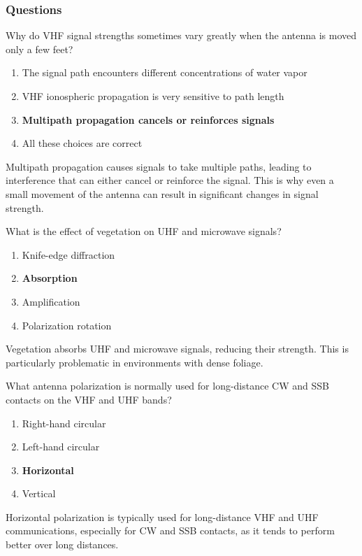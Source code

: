 \subsubsection*{Questions}

\begin{tcolorbox}[colback=gray!10!white,colframe=black!75!black,title={T3A01}]
    Why do VHF signal strengths sometimes vary greatly when the antenna is moved only a few feet?
    \begin{enumerate}[label=\Alph*),noitemsep]
        \item The signal path encounters different concentrations of water vapor
        \item VHF ionospheric propagation is very sensitive to path length
        \item \textbf{Multipath propagation cancels or reinforces signals}
        \item All these choices are correct
    \end{enumerate}
\end{tcolorbox}
Multipath propagation causes signals to take multiple paths, leading to interference that can either cancel or reinforce the signal. This is why even a small movement of the antenna can result in significant changes in signal strength.

\begin{tcolorbox}[colback=gray!10!white,colframe=black!75!black,title={T3A02}]
    What is the effect of vegetation on UHF and microwave signals?
    \begin{enumerate}[label=\Alph*),noitemsep]
        \item Knife-edge diffraction
        \item \textbf{Absorption}
        \item Amplification
        \item Polarization rotation
    \end{enumerate}
\end{tcolorbox}
Vegetation absorbs UHF and microwave signals, reducing their strength. This is particularly problematic in environments with dense foliage.

\begin{tcolorbox}[colback=gray!10!white,colframe=black!75!black,title={T3A03}]
    What antenna polarization is normally used for long-distance CW and SSB contacts on the VHF and UHF bands?
    \begin{enumerate}[label=\Alph*),noitemsep]
        \item Right-hand circular
        \item Left-hand circular
        \item \textbf{Horizontal}
        \item Vertical
    \end{enumerate}
\end{tcolorbox}
Horizontal polarization is typically used for long-distance VHF and UHF communications, especially for CW and SSB contacts, as it tends to perform better over long distances.

